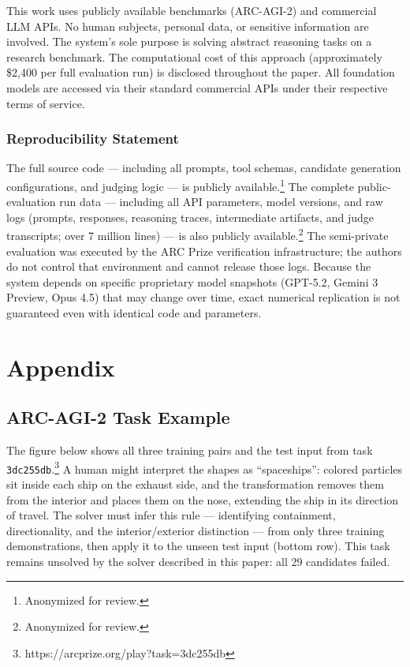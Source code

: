 \documentclass[10pt]{article}
\begin{document}
This work uses publicly available benchmarks (ARC-AGI-2) and commercial
LLM APIs. No human subjects, personal data, or sensitive information are
involved. The system's sole purpose is solving abstract reasoning tasks
on a research benchmark. The computational cost of this approach
(approximately \$2,400 per full evaluation run) is disclosed throughout
the paper. All foundation models are accessed via their standard
commercial APIs under their respective terms of service.

\subsubsection*{Reproducibility Statement}

The full source code --- including all prompts, tool schemas, candidate
generation configurations, and judging logic --- is publicly
available.\footnote{Anonymized for review.} The complete
public-evaluation run data --- including all API parameters, model
versions, and raw logs (prompts, responses, reasoning traces,
intermediate artifacts, and judge transcripts; over 7 million lines) ---
is also publicly available.\footnote{Anonymized for review.} The
semi-private evaluation was executed by the ARC Prize verification
infrastructure; the authors do not control that environment and cannot
release those logs. Because the system depends on specific proprietary
model snapshots (GPT-5.2, Gemini 3 Preview, Opus 4.5) that may change
over time, exact numerical replication is not guaranteed even with
identical code and parameters.

\appendix

\hypertarget{appendix}{%
\section{Appendix}\label{appendix}}

\hypertarget{arc-agi-2-task-example}{%
\subsection{ARC-AGI-2 Task Example}\label{arc-agi-2-task-example}}

The figure below shows all three training pairs and the test input from
task \texttt{3dc255db}.\footnote{https://arcprize.org/play?task=3dc255db}
A human might interpret the shapes as ``spaceships'': colored particles
sit inside each ship on the exhaust side, and the transformation removes
them from the interior and places them on the nose, extending the ship
in its direction of travel. The solver must infer this rule ---
identifying containment, directionality, and the interior/exterior
distinction --- from only three training demonstrations, then apply it
to the unseen test input (bottom row). This task remains unsolved by the
solver described in this paper: all 29 candidates failed.
\end{document}
